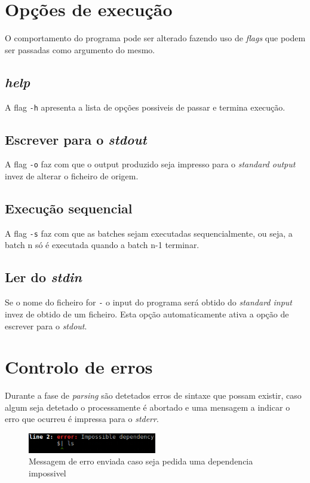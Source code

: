 \documentclass[12pt,a4paper]{report}
\begin{document}
\chapter{Opções de execução}
    O comportamento do programa pode ser alterado fazendo uso de \textit{flags}
    que podem ser passadas como argumento do mesmo.
    \section{\textit{help}}
        A flag \texttt{-h} apresenta a lista de opções possiveis
        de passar e termina execução.
    \section{Escrever para o \textit{stdout}}
        A flag \texttt{-o} faz com que o output produzido seja
        impresso para o \textit{standard output} invez de alterar o ficheiro
        de origem.
    \section{Execução sequencial}
        A flag \texttt{-s} faz com que as batches sejam executadas
        sequencialmente, ou seja, a batch n só é executada quando a batch n-1
        terminar.
    \section{Ler do \textit{stdin}}
        Se o nome do ficheiro for \texttt{-} o input do programa será
        obtido do \textit{standard input} invez de obtido de um ficheiro. Esta
        opção automaticamente ativa a opção de escrever para o \textit{stdout}.

\chapter{Controlo de erros}
    Durante a fase de \textit{parsing} são detetados erros de sintaxe que possam
    existir, caso algum seja detetado o processamente é abortado e uma mensagem
    a indicar o erro que ocurreu é impressa para o \textit{stderr}.

    \begin{figure}[h]
        \centering
        \includegraphics[width=0.5\textwidth]{./images/parseError.png}
        \caption{Messagem de erro enviada caso seja pedida uma dependencia
                    impossivel}
        \label{fig:parseError}
    \end{figure}
\end{document}
